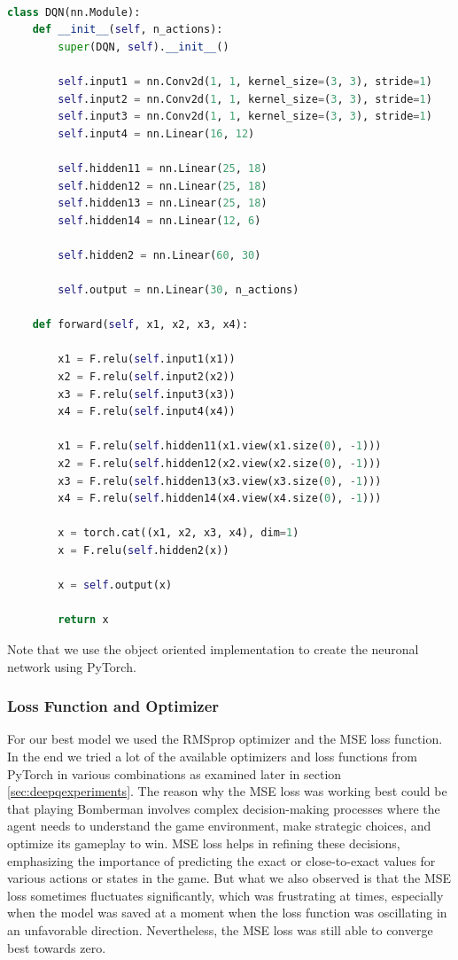 \begin{lstlisting}[language=Python]

class DQN(nn.Module):
    def __init__(self, n_actions):
        super(DQN, self).__init__()

        self.input1 = nn.Conv2d(1, 1, kernel_size=(3, 3), stride=1)
        self.input2 = nn.Conv2d(1, 1, kernel_size=(3, 3), stride=1)
        self.input3 = nn.Conv2d(1, 1, kernel_size=(3, 3), stride=1)
        self.input4 = nn.Linear(16, 12)

        self.hidden11 = nn.Linear(25, 18)
        self.hidden12 = nn.Linear(25, 18)
        self.hidden13 = nn.Linear(25, 18)
        self.hidden14 = nn.Linear(12, 6)

        self.hidden2 = nn.Linear(60, 30)

        self.output = nn.Linear(30, n_actions)

    def forward(self, x1, x2, x3, x4):

        x1 = F.relu(self.input1(x1))
        x2 = F.relu(self.input2(x2))
        x3 = F.relu(self.input3(x3))
        x4 = F.relu(self.input4(x4))

        x1 = F.relu(self.hidden11(x1.view(x1.size(0), -1)))
        x2 = F.relu(self.hidden12(x2.view(x2.size(0), -1)))
        x3 = F.relu(self.hidden13(x3.view(x3.size(0), -1)))
        x4 = F.relu(self.hidden14(x4.view(x4.size(0), -1)))

        x = torch.cat((x1, x2, x3, x4), dim=1)
        x = F.relu(self.hidden2(x))

        x = self.output(x)

        return x

\end{lstlisting}

\noindent Note that we use the object oriented implementation to create the neuronal network 
using PyTorch.

\subsubsection{Loss Function and Optimizer}

For our best model we used the RMSprop optimizer and the MSE loss function. In the end 
we tried a lot of the available optimizers and loss functions from PyTorch 
in various combinations as examined later in section \ref{sec:deepqexperiments}. The reason why the MSE loss was working best could be that playing Bomberman involves complex decision-making processes where the agent needs to understand the game environment, 
make strategic choices, and optimize its gameplay to win. MSE loss helps in refining these decisions, emphasizing the importance of predicting the 
exact or close-to-exact values for various actions or states in the game. But what we also observed is that the MSE loss sometimes 
fluctuates significantly, which was frustrating at times, especially when the model was saved at a moment when the loss function was oscillating 
in an unfavorable direction. Nevertheless, the MSE loss was still able to converge best towards zero.\\


